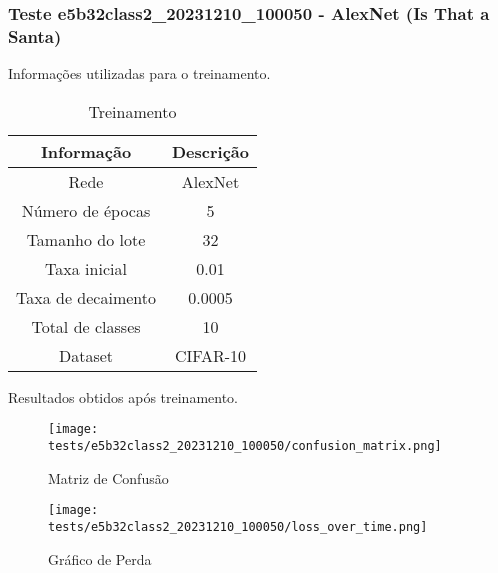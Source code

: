 \subsubsection{Teste e5b32class2_20231210_100050 - AlexNet (Is That a Santa)}

Informações utilizadas para o treinamento.

\begin{table}[ht]
   \centering
   \caption{Treinamento}
   \label{tab:modelos}
   \begin{tabular}{| c | c | }
      \hline 
      \textbf{Informação} & \textbf{Descrição} \\
      \hline \hline 
      Rede & AlexNet \\
      \hline
      Número de épocas & 5\\
      \hline
      Tamanho do lote & 32\\
      \hline
      Taxa inicial & 0.01 \\
      \hline
      Taxa de decaimento & 0.0005 \\
      \hline
      Total de classes & 10\\
      \hline
      Dataset & CIFAR-10\\
      \hline
   \end{tabular} 
\end{table}

Resultados obtidos após treinamento.


\begin{figure}[ht]
 \begin{center}
   \texttt{[image: tests/e5b32class2\_20231210\_100050/confusion\_matrix.png]}
  \caption{Matriz de Confusão}
  \label{fig:fig03}
 \end{center}
\end{figure}

\begin{figure}[ht]
 \begin{center}
   \texttt{[image: tests/e5b32class2\_20231210\_100050/loss\_over\_time.png]}
  \caption{Gráfico de Perda}
  \label{fig:fig04}
 \end{center}
\end{figure}
